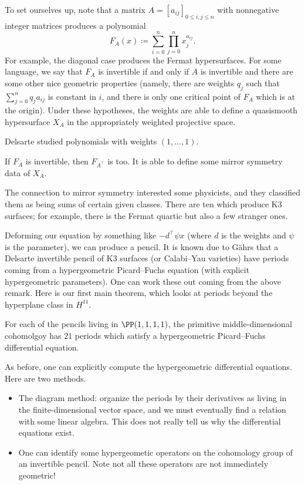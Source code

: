 \documentclass{article}
\begin{document}
To set ourselves up, note that a matrix $A=[a_{ij}]_{0\le i,j\le n}$ with nonnegative integer matrices produces a polynomial
\[F_A(x)\coloneqq\sum_{i=0}^n\prod_{j=0}^nx_j^{a_{ij}}.\]
For example, the diagonal case produces the Fermat hypersurfaces. For some language, we say that $F_A$ is invertible if and only if $A$ is invertible and there are some other nice geometric properties (namely, there are weights $q_j$ such that $\sum_{j=0}^nq_ja_{ij}$ is constant in $i$, and there is only one critical point of $F_A$ which is at the origin). Under these hypotheses, the weights are able to define a quasismooth hypersurface $X_A$ in the appropriately weighted projective space.
\begin{example}
	Delsarte studied polynomials with weights $(1,\ldots,1)$.
\end{example}
\begin{example}
	If $F_A$ is invertible, then $F_{A^\intercal}$ is too. It is able to define some mirror symmetry data of $X_A$.
\end{example}
\begin{remark}
	The connection to mirror symmetry interested some physicists, and they classified them as being sums of certain given classes. There are ten which produce K3 surfaces; for example, there is the Fermat quartic but also a few stranger ones.
\end{remark}
Deforming our equation by something like $-d^\intercal\psi x$ (where $d$ is the weights and $\psi$ is the parameter), we can produce a pencil. It is known due to G\"ahrs that a Delsarte invertible pencil of K3 surfaces (or Calabi--Yau varieties) have periods coming from a hypergeometric Picard--Fuchs equation (with explicit hypergeometric parameters). One can work these out coming from the above remark. Here is our first main theorem, which looks at periods beyond the hyperplane class in $H^{11}$.
\begin{theorem}
	For each of the pencils living in $\PP(1,1,1,1)$, the primitive middle-dimensional cohomolgoy has $21$ periods which satisfy a hypergeometric Picard--Fuchs differential equation.
\end{theorem}
As before, one can explicitly compute the hypergeometric differential equations. Here are two methods.
\begin{itemize}
	\item The diagram method: organize the periods by their derivatives as living in the finite-dimensional vector space, and we must eventually find a relation with some linear algebra. This does not really tell us why the differential equations exist.
	\item One can identify some hypergeometic operators on the cohomology group of an invertible pencil. Note not all these operators are not immediately geometric!
\end{itemize}
\end{document}
